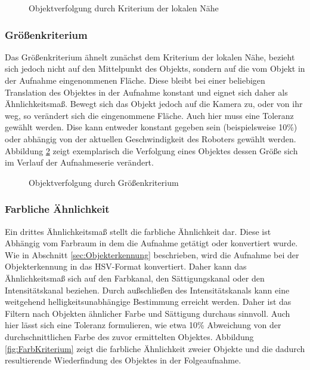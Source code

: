 \begin{figure}[h]
\centering
\caption{Objektverfolgung durch Kriterium der lokalen Nähe}
\label{fig:LokaleNaehe}
\end{figure}

\subsubsection{Größenkriterium}
Das Größenkriterium ähnelt zunächst dem Kriterium der lokalen Nähe, bezieht sich jedoch nicht auf den Mittelpunkt des Objekts, sondern auf die vom Objekt in der Aufnahme eingenommenen Fläche. Diese bleibt bei einer beliebigen Translation des Objektes in der Aufnahme konstant und eignet sich daher als Ähnlichkeitsmaß. Bewegt sich das Objekt jedoch auf die Kamera zu, oder von ihr weg, so verändert sich die eingenommene Fläche. Auch hier muss eine Toleranz gewählt werden. Dise kann entweder konstant gegeben sein (beispielsweise 10\%) oder abhängig von der aktuellen Geschwindigkeit des Roboters gewählt werden. Abbildung \ref{fig:GroessenKriterium} zeigt exemplarisch die Verfolgung eines Objektes dessen Größe sich im Verlauf der Aufnahmeserie verändert.

\begin{figure}[h]
\centering
\caption{Objektverfolgung durch Größenkriterium}
\label{fig:GroessenKriterium}
\end{figure}

\subsubsection{Farbliche Ähnlichkeit}
Ein drittes Ähnlichkeitsmaß stellt die farbliche Ähnlichkeit dar. Diese ist Abhängig vom Farbraum in dem die Aufnahme getätigt oder konvertiert wurde. Wie in Abschnitt \ref{sec:Objekterkennung} beschrieben, wird die Aufnahme bei der Objekterkennung in das HSV-Format konvertiert. Daher kann das Ähnlichkeitsmaß sich auf den Farbkanal, den Sättigungskanal oder den Intensitätskanal beziehen. Durch außschließen des Intensitätskanals kann eine weitgehend helligkeitsunabhängige Bestimmung erreicht werden. Daher ist das Filtern nach Objekten ähnlicher Farbe und Sättigung durchaus sinnvoll. Auch hier lässt sich eine Toleranz formulieren, wie etwa 10\% Abweichung von der durchschnittlichen Farbe des zuvor ermittelten Objektes. Abbildung \ref{fig:FarbKriterium} zeigt die farbliche Ähnlichkeit zweier Objekte und die dadurch resultierende Wiederfindung des Objektes in der Folgeaufnahme.

